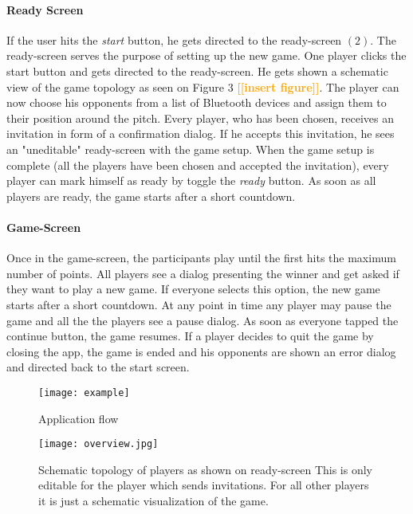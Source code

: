 \documentclass{report}
\newcommand{\todo}[1]{\textsf{\textbf{\textcolor{orange}{[[#1]]}}}}
\newcommand{\lfig}[1]{\label{fig:#1}}
\begin{document}
\paragraph{Ready Screen}
If the user hits the \textit{start} button, he gets directed to the ready-screen $(2)$. The ready-screen serves the purpose of setting up the new game. One player clicks the start button and gets directed to the ready-screen. He gets shown a schematic view of the game topology as seen on Figure 3 \todo{insert figure}. The player can now choose his opponents from a list of Bluetooth devices and assign them to their position around the pitch. Every player, who has been chosen, receives an invitation in form of a confirmation dialog. If he accepts this invitation, he sees an "uneditable" ready-screen with the game setup. When the game setup is complete (all the players have been chosen and accepted the invitation), every player can mark himself as ready by toggle the \textit{ready} button. As soon as all players are ready, the game starts after a short countdown.

\paragraph{Game-Screen}
Once in the game-screen, the participants play until the first hits the maximum number of points. All players see a dialog presenting the winner and get asked if they want to play a new game. If everyone selects this option, the new game starts after a short countdown. At any point in time any player may pause the game and all the the players see a pause dialog. As soon as everyone tapped the continue button, the game resumes. If a player decides to quit the game by closing the app, the game is ended and his opponents are shown an error dialog and directed back to the start screen.

\begin{figure}[h]
	\centering
    \texttt{[image: example]}
    \lfig{example}
    \vspace{-5mm} %
	\caption{Application flow}
\end{figure}

\begin{figure}[h]
	\centering
    \texttt{[image: overview.jpg]}
    \lfig{system-overview}
    \vspace{-5mm} %
	\caption{Schematic topology of players as shown on ready-screen This is only editable for the player which sends invitations. For all other players it is just a schematic visualization of the game.}
\end{figure}
\end{document}
